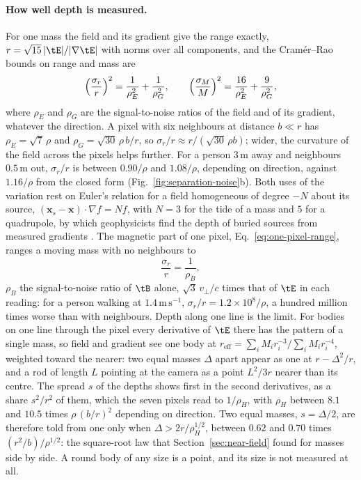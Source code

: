 \paragraph{How well depth is measured.} For one mass the field and its gradient
give the range exactly, $r = \sqrt{15}\,|\tE|/|\nabla\tE|$ with norms over all
components, and the Cram\'er--Rao bounds on range and mass are
\begin{equation}\label{eq:depth-bound}
\Bigl(\frac{\sigma_r}{r}\Bigr)^2 = \frac{1}{\rho_E^2} + \frac{1}{\rho_G^2},
\qquad
\Bigl(\frac{\sigma_M}{M}\Bigr)^2 = \frac{16}{\rho_E^2} + \frac{9}{\rho_G^2},
\end{equation}
where $\rho_E$ and $\rho_G$ are the signal-to-noise ratios of the field and of
its gradient, whatever the direction. A pixel with six neighbours at distance
$b \ll r$ has $\rho_E = \sqrt7\,\rho$ and $\rho_G = \sqrt{30}\,\rho\,b/r$, so
$\sigma_r/r \approx r/(\sqrt{30}\,\rho b)$; wider, the curvature of the field
across the pixels helps further. For a person $3\,\mathrm{m}$ away and
neighbours $0.5\,\mathrm{m}$ out, $\sigma_r/r$ is between $0.90/\rho$ and
$1.08/\rho$, depending on direction, against $1.16/\rho$ from the closed form
(Fig.~\ref{fig:separation-noise}b). Both uses of the
variation rest on Euler's relation for a field homogeneous of degree $-N$ about
its source, $(\mathbf{x}_s - \mathbf{x})\cdot\nabla f = N f$, with $N = 3$ for
the tide of a mass and $5$ for a quadrupole, by which geophysicists find the
depth of buried sources from measured gradients \cite{Thompson1982,Reid1990}.
The magnetic part of one pixel, Eq.~\eqref{eq:one-pixel-range}, ranges a moving
mass with no neighbours to
\begin{equation}\label{eq:magnetic-range}
\frac{\sigma_r}{r} = \frac{1}{\rho_B} ,
\end{equation}
$\rho_B$ the signal-to-noise ratio of $\tB$ alone, $\sqrt3\,v_\perp/c$ times
that of $\tE$ in each reading: for a person walking at
$1.4\,\mathrm{m\,s^{-1}}$, $\sigma_r/r = 1.2\times10^{8}/\rho$, a hundred
million times worse than with neighbours. Depth along one line is the limit.
For bodies on one line through the pixel every derivative of $\tE$ there has the
pattern of a single mass, so field and gradient see one body at
$r_{\mathrm{eff}} = \sum_i M_i r_i^{-3} / \sum_i M_i r_i^{-4}$, weighted toward
the nearer: two equal masses $\Delta$ apart appear as one at
$r - \Delta^2/r$, and a rod of length $L$ pointing at the camera as a point
$L^2/3r$ nearer than its centre. The spread $s$ of the depths shows first in
the second derivatives, as a share $s^2/r^2$ of them, which the seven pixels
read to $1/\rho_H$, with $\rho_H$ between $8.1$ and $10.5$ times
$\rho\,(b/r)^2$ depending on direction. Two equal masses, $s = \Delta/2$, are
therefore told from one only when $\Delta > 2r/\rho_H^{1/2}$, between $0.62$
and $0.70$ times $(r^2/b)/\rho^{1/2}$: the square-root law that
Section~\ref{sec:near-field} found for masses side by side. A round body of any
size is a point, and its size is not measured at all.

